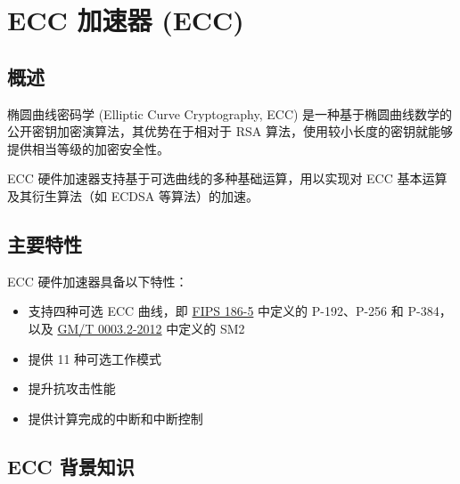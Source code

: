 \documentclass[main\_\_CN.tex]{subfiles}
\begin{document}
\setchineseformatting


\ifglobal
\else
    \clearpage
    \listoftodos
    \listofdonetodos
    \tableofcontents
\fi



\hypertarget{ecc}{}
\chapter{ECC 加速器 (ECC)}
\label{mod:ecc}

\section{概述}

椭圆曲线密码学 (Elliptic Curve Cryptography, ECC) 是一种基于椭圆曲线数学的公开密钥加密演算法，其优势在于相对于 RSA 算法，使用较小长度的密钥就能够提供相当等级的加密安全性。

\chipname{} ECC 硬件加速器支持基于可选曲线的多种基础运算，用以实现对 ECC 基本运算及其衍生算法（如 ECDSA 等算法）的加速。

\section{主要特性}

\chipname{} ECC 硬件加速器具备以下特性：

\begin{itemize}
    \item 支持四种可选 ECC 曲线，即 \href{https://nvlpubs.nist.gov/nistpubs/FIPS/NIST.FIPS.186-5.pdf}{FIPS 186-5} 中定义的 P-192、P-256 和 P-384，以及 \href{http://www.gmbz.org.cn/file/2018-01-08/f60d13a3-e0fd-40d8-a80f-13fde691ef03.pdf}{GM/T 0003.2-2012} 中定义的 SM2
    \item 提供 11 种可选工作模式
    \item 提升抗攻击性能
    \item 提供计算完成的中断和中断控制
\end{itemize}

\section{ECC 背景知识}
\end{document}
